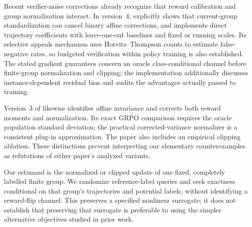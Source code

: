 Recent verifier-noise corrections already recognize that reward calibration and group normalization interact. In version~4, \citet{cai2025} explicitly shows that current-group standardization can cancel binary affine corrections, and implements direct trajectory coefficients with leave-one-out baselines and fixed or running scales. Its selective appeals mechanism uses Horvitz--Thompson counts to estimate false-negative rates, so budgeted verification within policy training is also established. The stated gradient guarantees concern an oracle class-conditional channel before finite-group normalization and clipping; the implementation additionally discusses instance-dependent residual bias and audits the advantages actually passed to training.

Version~3 of \citet{mansouri2025} likewise identifies affine invariance and corrects both reward moments and normalization. Its exact GRPO comparison requires the oracle population standard deviation; the practical corrected-variance normalizer is a consistent plug-in approximation. The paper also includes an empirical clipping ablation. These distinctions prevent interpreting our elementary counterexamples as refutations of either paper's analyzed variants.

Our estimand is the normalized or clipped update of one fixed, completely labelled finite group. We randomize reference-label queries and seek exactness conditional on that group's trajectories and potential labels, without identifying a reward-flip channel. This preserves a specified nonlinear surrogate; it does not establish that preserving that surrogate is preferable to using the simpler alternative objectives studied in prior work.

